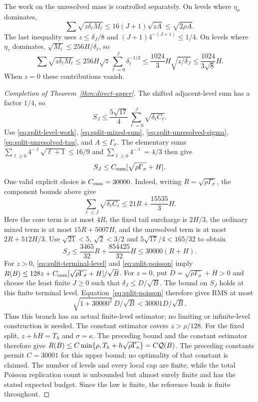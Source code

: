 The work on the unresolved mass is controlled separately.
On levels where $\eta_\sigma$ dominates,
\begin{equation}\label{eq:split-unresolved-sigma}
 \sum\sqrt{z\delta_\ell M_\ell}
 \le16(J+1)\sqrt{zA}\le\sqrt{2\rho A}.
\end{equation}
The last inequality uses $z\le\delta_J/8$ and
$(J+1)4^{-(J+1)}\le1/4$.
On levels where $\eta_\tau$ dominates,
$\sqrt{M_\ell}\le256H/\delta_\ell$, so
\begin{equation}\label{eq:split-unresolved-tau}
 \sum\sqrt{z\delta_\ell M_\ell}
 \le256H\sqrt z\sum_{\ell=0}^J\delta_\ell^{-1/2}
 \le\frac{1024}{3}H\sqrt{z/\delta_J}
 \le\frac{1024}{3\sqrt8}H.
\end{equation}
When $z=0$ these contributions vanish.

\begin{proof}[Completion of Theorem~\ref{thm:direct-upper}]
The shifted adjacent-level sum has a factor $1/4$, so
\[
 S_J\le\frac{5\sqrt{17}}4
                \sum_{\ell=0}^J\sqrt{\delta_\ell C_\ell}.
\]
Use \eqref{eq:split-level-work}, \eqref{eq:split-mixed-sum},
\eqref{eq:split-unresolved-sigma}, \eqref{eq:split-unresolved-tau},
and $A\le\Gamma_\sigma$. The elementary sums
$\sum_{\ell\ge0}4^{-\ell}\sqrt{\ell+1}\le16/9$ and
$\sum_{\ell\ge0}4^{-\ell}=4/3$ then give
\[
 S_J\le C_{\rm sum}[\sqrt{\rho\Gamma_\sigma}+H].
\]
One valid explicit choice is $C_{\rm sum}=30000$. Indeed, writing
$R=\sqrt{\rho\Gamma_\sigma}$, the component bounds above give
\[
 \sum_{\ell\le J}\sqrt{\delta_\ell C_\ell}
 \le21R+\frac{15535}{3}H.
\]
Here the core term is at most $4R$, the fixed tail surcharge is $2H/3$,
the ordinary mixed term is at most $15R+5007H$, and the unresolved
term is at most $2R+512H/3$. Use $\sqrt{21}<5$, $\sqrt2<3/2$ and
$5\sqrt{17}/4<165/32$ to obtain
\[
 S_J\le\frac{3465}{32}R+\frac{854425}{32}H
       \le30000(R+H).
\]
For $z>0$, \eqref{eq:split-terminal-level} and
\eqref{eq:split-poisson} imply
$R(B)\le128z+C_{\rm sum}[\sqrt{\rho\Gamma_\sigma}+H]/\sqrt B$.
For $z=0$, put $D=\sqrt{\rho\Gamma_\sigma}+H>0$ and choose the least
finite $J\ge0$ such that $\delta_J\le D/\sqrt B$. The bound on $S_J$
holds at this finite terminal level. Equation~\eqref{eq:split-poisson}
therefore gives RMS at most
\[
 \sqrt{1+30000^2}\,D/\sqrt B<30001D/\sqrt B.
\]
Thus this branch has an actual finite-level estimator; no limiting
or infinite-level construction is needed.
The constant estimator covers $z>\rho/128$.
For the fixed split, $z+hH=T_h$ and $\sigma=\kappa$.
The preceding bound and the constant estimator therefore give
$R(B)\le C\min\{\rho,T_h+h\sqrt{\rho\Gamma_\kappa}\}=C\mathcal Q(B)$.
The preceding constants permit $C=30001$ for this upper bound; no
optimality of that constant is claimed. The number of levels and every
local cap are finite, while the total Poisson replication count is
unbounded but almost surely finite and has the stated expected budget.
Since the law is finite, the reference bank is finite throughout.
\end{proof}
